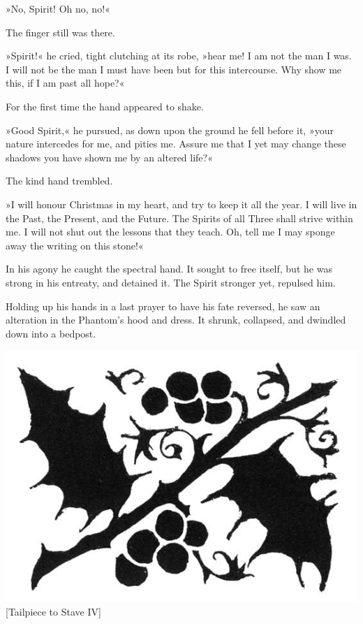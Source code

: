 »No, Spirit! Oh no, no!«

The finger still was there.

»Spirit!« he cried, tight clutching at its robe, »hear me! I am not the man I was. I will not be the man I must have been but for this intercourse. Why show me this, if I am past all hope?«

For the first time the hand appeared to shake.

»Good Spirit,« he pursued, as down upon the ground he fell before it, »your nature intercedes for me, and pities me. Assure me that I yet may change these shadows you have shown me by an altered life?«

The kind hand trembled.

»I will honour Christmas in my heart, and try to keep it all the year. I will live in the Past, the Present, and the Future. The Spirits of all Three shall strive within me. I will not shut out the lessons that they teach. Oh, tell me I may sponge away the writing on this stone!«

In his agony he caught the spectral hand. It sought to free itself, but he was strong in his entreaty, and detained it. The Spirit stronger yet, repulsed him.

Holding up his hands in a last prayer to have his fate reversed, he saw an alteration in the Phantom's hood and dress. It shrunk, collapsed, and dwindled down into a bedpost.


\enlargethispage{\baselineskip} 

\begin{center}
\includegraphics[width=.45\textwidth]{gs056}
[Tailpiece to Stave IV]{}
\end{center}

\clearpage